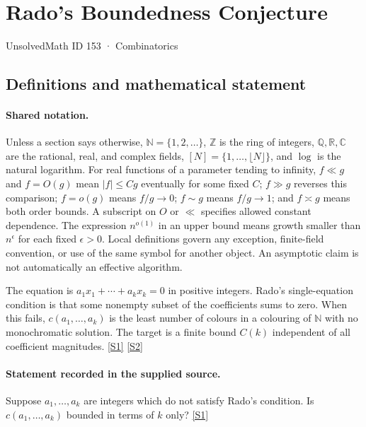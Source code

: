 \documentclass[11pt,a4paper]{article}
\newcommand{\N}{\mathbb{N}}
\newcommand{\Z}{\mathbb{Z}}
\newcommand{\Q}{\mathbb{Q}}
\newcommand{\R}{\mathbb{R}}
\newcommand{\C}{\mathbb{C}}
\newcommand{\sref}[2]{\hyperlink{source:#1:#2}{[S#2]}}
\begin{document}

\setcounter{section}{152}

\section{Rado's Boundedness Conjecture}\label{153}

{\small\sffamily UnsolvedMath ID 153 · Combinatorics}

\subsection{Definitions and mathematical statement}

\paragraph{Shared notation.}Unless a section says otherwise, $\N=\{1,2,\ldots\}$,
$\Z$ is the ring of integers, $\Q,\R,\C$ are the rational, real, and complex
fields, $[N]=\{1,\ldots,\lfloor N\rfloor\}$, and $\log$ is the natural
logarithm. For real functions of a parameter tending to infinity,
$f\ll g$ and $f=O(g)$ mean $|f|\leq Cg$ eventually for some fixed $C$;
$f\gg g$ reverses this comparison; $f=o(g)$ means $f/g\to0$;
$f\sim g$ means $f/g\to1$; and $f\asymp g$ means both order bounds.
A subscript on $O$ or $\ll$ specifies allowed constant dependence.
The expression $n^{o(1)}$ in an upper bound means growth smaller than
$n^\epsilon$ for each fixed $\epsilon>0$. Local definitions govern any
exception, finite-field convention, or use of the same symbol for another
object. An asymptotic claim is not automatically an effective algorithm.



The equation is $a_1x_1+\cdots+a_kx_k=0$ in positive integers. Rado's single-equation condition is that some nonempty subset of the coefficients sums to zero. When this fails, $c(a_1,\ldots,a_k)$ is the least number of colours in a colouring of $\N$ with no monochromatic solution. The target is a finite bound $C(k)$ independent of all coefficient magnitudes. \sref{153}{1} \sref{153}{2}

\paragraph{Statement recorded in the supplied source.}
Suppose $a_1, \dots, a_k$ are integers which do not satisfy Rado's condition. Is $c(a_1, \dots, a_k)$ bounded in terms of $k$ only? \sref{153}{1}
\end{document}
